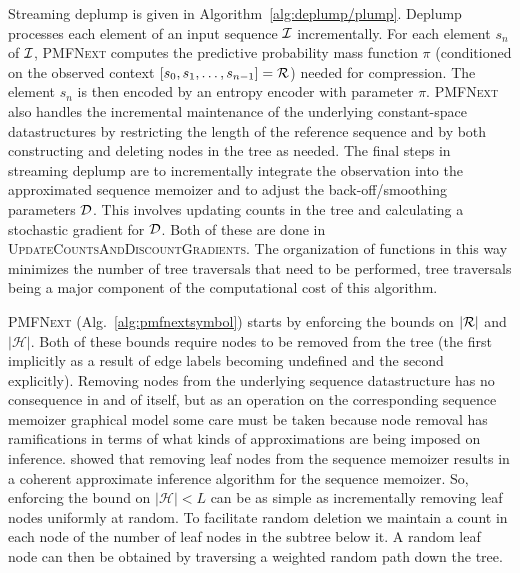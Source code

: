 Streaming deplump is given in Algorithm~\ref{alg:deplump/plump}.  Deplump processes each element of an input sequence $\IS$ incrementally.  For each element $s_n$ of $\IS$, \textsc{PMFNext} computes the predictive probability mass function $\pi$ (conditioned on the observed context $[s_0, s_1, \ldots, s_{n-1}] = \RS$) needed for compression.  The element $s_n$ is then encoded by an entropy encoder with parameter $\pi$.  \textsc{PMFNext} also handles the incremental maintenance of the underlying constant-space datastructures by restricting the length of the reference sequence and by both constructing and deleting nodes in the tree as needed.  The final steps in streaming deplump are to incrementally integrate the observation into the approximated sequence memoizer and to adjust the back-off/smoothing parameters $\D$.  This involves updating counts in the tree and calculating a stochastic gradient for $\D$.  Both of these are done in \textsc{UpdateCountsAndDiscountGradients}. %
The organization of functions in this way minimizes the number of tree traversals that need to be performed, tree traversals being a major component of the computational cost of this algorithm.

\textsc{PMFNext} (Alg.~\ref{alg:pmfnextsymbol}) starts by enforcing the bounds on $|\RS|$ and $|\mathcal{H}|$.  Both of these bounds require nodes to be removed from the tree (the first implicitly as a result of edge labels becoming undefined and the second explicitly).  Removing nodes from the underlying sequence datastructure has no consequence in and of itself, but as an operation on the corresponding sequence memoizer graphical model some care must be taken because node removal has ramifications in terms of what kinds of approximations are being imposed on inference.  \cite{Bartlett2010} showed that removing leaf nodes from the sequence memoizer results in a coherent approximate inference algorithm for the sequence memoizer.  So, enforcing the bound on $| \mathcal{H} | < L$ can be as simple as incrementally removing leaf nodes uniformly at random.  To facilitate random deletion we maintain a count in each node of the number of leaf nodes in the subtree below it.  A random leaf node can then be obtained by traversing a weighted random path down the tree.  


